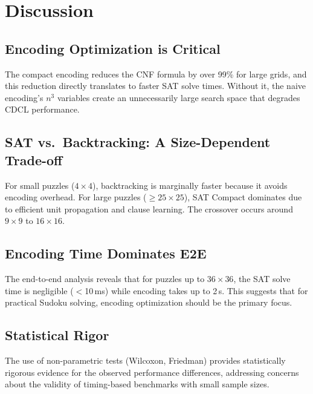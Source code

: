 \documentclass[12pt]{article}
\begin{document}
\section{Discussion}

\subsection{Encoding Optimization is Critical}
The compact encoding reduces the CNF formula by over 99\% for large grids, and this reduction directly translates to faster SAT solve times. Without it, the naive encoding's $n^3$ variables create an unnecessarily large search space that degrades CDCL performance.

\subsection{SAT vs.\ Backtracking: A Size-Dependent Trade-off}
For small puzzles ($4\times4$), backtracking is marginally faster because it avoids encoding overhead. For large puzzles ($\geq 25\times25$), SAT Compact dominates due to efficient unit propagation and clause learning. The crossover occurs around $9\times9$ to $16\times16$.

\subsection{Encoding Time Dominates E2E}
The end-to-end analysis reveals that for puzzles up to $36\times36$, the SAT solve time is negligible ($<$10\,ms) while encoding takes up to 2\,s. This suggests that for practical Sudoku solving, encoding optimization should be the primary focus.

\subsection{Statistical Rigor}
The use of non-parametric tests (Wilcoxon, Friedman) provides statistically rigorous evidence for the observed performance differences, addressing concerns about the validity of timing-based benchmarks with small sample sizes.
\end{document}
